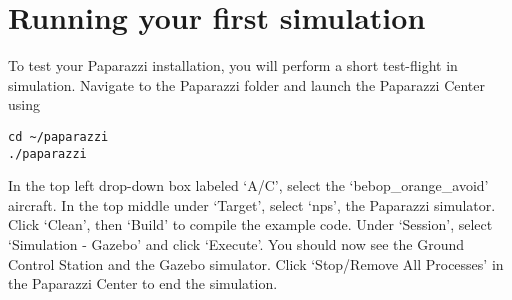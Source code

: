 \documentclass{article}
\begin{document}
\section{Running your first simulation}
To test your Paparazzi installation, you will perform a short test-flight in simulation.
Navigate to the Paparazzi folder and launch the Paparazzi Center using
\begin{lstlisting}[style=Bash]
cd ~/paparazzi
./paparazzi
\end{lstlisting}
In the top left drop-down box labeled `A/C', select the `bebop\_orange\_avoid' aircraft.
In the top middle under `Target', select `nps', the Paparazzi simulator.
Click `Clean', then `Build' to compile the example code.
Under `Session', select `Simulation - Gazebo' and click `Execute'. You should now see the Ground Control Station and the Gazebo simulator.
Click `Stop/Remove All Processes' in the Paparazzi Center to end the simulation.
\end{document}
